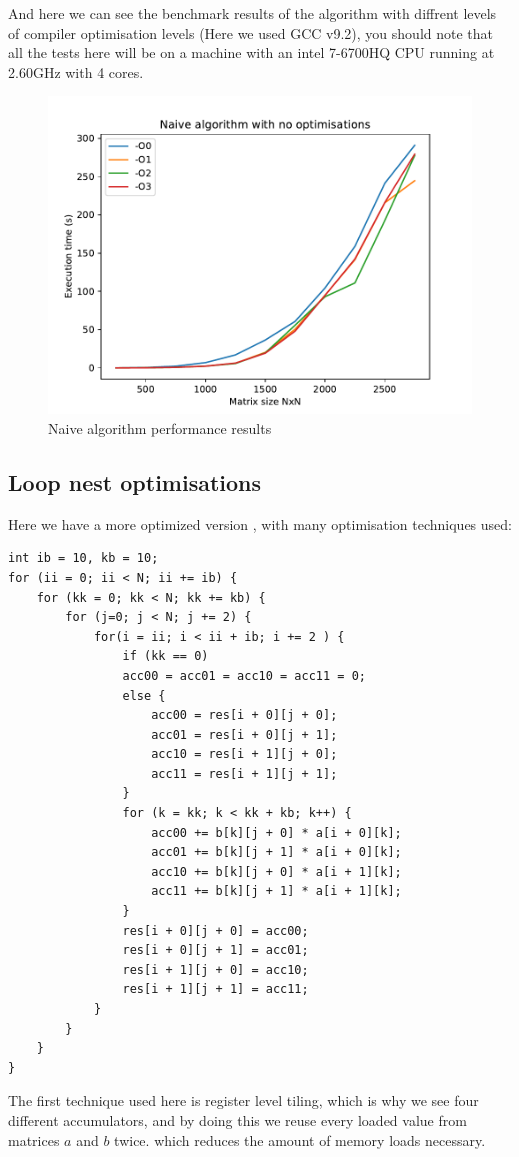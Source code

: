 \documentclass {article}
\begin{document}
And here we can see the benchmark results of the algorithm with diffrent levels
of compiler optimisation levels (Here we used GCC v9.2), you should note that
all the tests here will be on a machine with an intel 7-6700HQ CPU running at 
2.60GHz with 4 cores.

\begin{figure}[H]
    \includegraphics[width=\linewidth]{plot/no_opt.pdf}
    \caption{Naive algorithm performance results}
    \label{fig:no_opt}
\end{figure}

\subsection{Loop nest optimisations}
Here we have a more optimized version \cite{dataloc:1} \cite{looptil:1}
\cite{looptilpar:1},  with many optimisation techniques used:
\begin{lstlisting}
int ib = 10, kb = 10;
for (ii = 0; ii < N; ii += ib) {
    for (kk = 0; kk < N; kk += kb) {
        for (j=0; j < N; j += 2) {
            for(i = ii; i < ii + ib; i += 2 ) {
                if (kk == 0)
                acc00 = acc01 = acc10 = acc11 = 0;
                else {
                    acc00 = res[i + 0][j + 0];
                    acc01 = res[i + 0][j + 1];
                    acc10 = res[i + 1][j + 0];
                    acc11 = res[i + 1][j + 1];
                }
                for (k = kk; k < kk + kb; k++) {
                    acc00 += b[k][j + 0] * a[i + 0][k];
                    acc01 += b[k][j + 1] * a[i + 0][k];
                    acc10 += b[k][j + 0] * a[i + 1][k];
                    acc11 += b[k][j + 1] * a[i + 1][k];
                }
                res[i + 0][j + 0] = acc00;
                res[i + 0][j + 1] = acc01;
                res[i + 1][j + 0] = acc10;
                res[i + 1][j + 1] = acc11;
            }
        }
    }
}
\end{lstlisting}
The first technique used here is register level tiling, which is why we see
four different accumulators, and by doing this we reuse every loaded value from
matrices $a$ and $b$ twice. which reduces the amount of memory loads
necessary.\\
\end{document}
